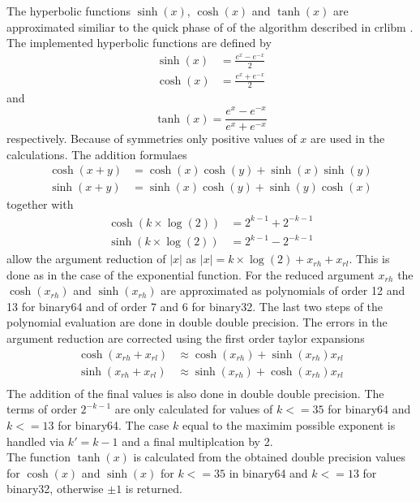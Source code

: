 \documentclass[10pt,a4paper,final,oneside]{article}
\numberwithin{equation}{subsection}
\begin{document}
The hyperbolic functions $\sinh(x)$, $\cosh(x)$ and $\tanh(x)$
are approximated similiar to the quick phase of of the algorithm
described in crlibm \cite{crlibmweb}.
The implemented hyperbolic functions are defined by
\[
    \begin{aligned}
        \sinh(x) &= \frac{e^x -  e^{-x}}{2} \\
        \cosh(x) &= \frac{e^x +  e^{-x}}{2}
    \end{aligned}
\]
and
\[
    \tanh(x) = \frac{e^x -  e^{-x}}{e^x +  e^{-x}}
\]
respectively. Because of symmetries only positive values of $x$ are used
in the calculations.
The addition formulaes
\[
    \begin{aligned}
        \cosh(x + y) &= \cosh(x)  \cosh(y) + \sinh(x)  \sinh(y) \\
        \sinh(x + y) &= \sinh(x)  \cosh(y) + \sinh(y)  \cosh(x)
    \end{aligned}
\]
together with
\[
    \begin{aligned}
        \cosh(k\times\log(2)) &= 2^{k-1} + 2^{-k-1} \\
        \sinh(k\times\log(2)) &= 2^{k-1} - 2^{-k-1}
    \end{aligned}
\]
allow the argument reduction of $|x|$ as
$ |x|= k \times \log(2) + x_{rh} + x_{rl}$.
This is done as in the case of the exponential function.
For the reduced argument $x_{rh}$ the $\cosh(x_{rh})$ and $\sinh(x_{rh})$ are approximated as polynomials of order 12 and 13 for binary64 and of
order 7 and 6 for binary32. The last two steps of the polynomial
evaluation are done in double double precision.
The errors in the argument reduction are corrected using the first
order taylor expansions
\[
    \begin{aligned}
        \cosh(x_{rh} + x_{rl}) &\approx \cosh(x_{rh}) + \sinh(x_{rh}) x_{rl} \\
        \sinh(x_{rh} + x_{rl}) &\approx \sinh(x_{rh}) + \cosh(x_{rh}) x_{rl} \\
    \end{aligned}
\]
The addition of the final values is also done in double double precision.
The terms of order $ 2^{-k-1} $ are only calculated for values of
$ k <= 35 $ for binary64 and $ k <= 13 $ for binary64.
The case $k$ equal to the maximim possible exponent is handled
via  $k' = k - 1$ and a final multiplcation by 2. \\[10pt]
The function $\tanh(x)$ is calculated from the obtained double precision
values for $\cosh(x)$ and $\sinh(x)$ for $ k<=35 $ in binary64 and
$k <=13$ for binary32, otherwise $\pm 1$ is returned.
\end{document}

